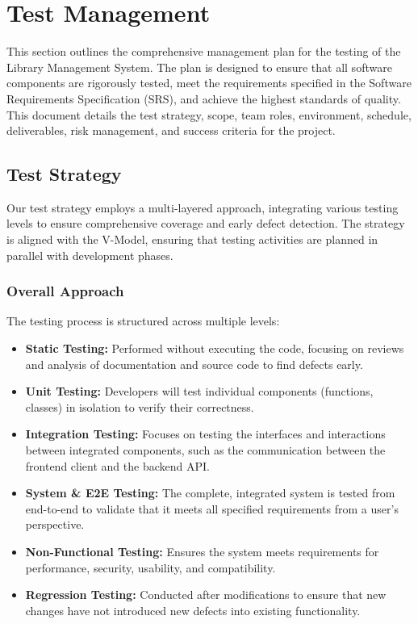 \chapter{Test Management}
\label{chap:TestManagement}

This section outlines the comprehensive management plan for the testing of the Library Management System. The plan is designed to ensure that all software components are rigorously tested, meet the requirements specified in the Software Requirements Specification (SRS), and achieve the highest standards of quality. This document details the test strategy, scope, team roles, environment, schedule, deliverables, risk management, and success criteria for the project.

\section{Test Strategy}
Our test strategy employs a multi-layered approach, integrating various testing levels to ensure comprehensive coverage and early defect detection. The strategy is aligned with the V-Model, ensuring that testing activities are planned in parallel with development phases.

\subsection{Overall Approach}
The testing process is structured across multiple levels:
\begin{itemize}
    \item \textbf{Static Testing:} Performed without executing the code, focusing on reviews and analysis of documentation and source code to find defects early.
    \item \textbf{Unit Testing:} Developers will test individual components (functions, classes) in isolation to verify their correctness.
    \item \textbf{Integration Testing:} Focuses on testing the interfaces and interactions between integrated components, such as the communication between the frontend client and the backend API.
    \item \textbf{System \& E2E Testing:} The complete, integrated system is tested from end-to-end to validate that it meets all specified requirements from a user's perspective.
    \item \textbf{Non-Functional Testing:} Ensures the system meets requirements for performance, security, usability, and compatibility.
    \item \textbf{Regression Testing:} Conducted after modifications to ensure that new changes have not introduced new defects into existing functionality.
\end{itemize}

